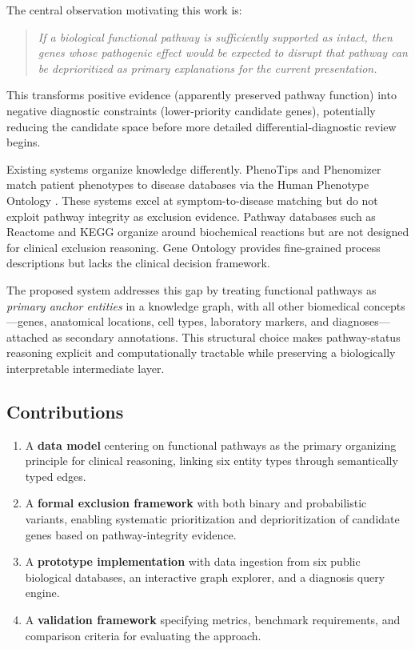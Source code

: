 \documentclass[12pt,a4paper]{article}
\begin{document}
The central observation motivating this work is:

\begin{quote}
\emph{If a biological functional pathway is sufficiently supported as intact, then genes whose pathogenic effect would be expected to disrupt that pathway can be deprioritized as primary explanations for the current presentation.}
\end{quote}

This transforms positive evidence (apparently preserved pathway function) into negative diagnostic constraints (lower-priority candidate genes), potentially reducing the candidate space before more detailed differential-diagnostic review begins.

Existing systems organize knowledge differently. PhenoTips \citep{Girdea2013} and Phenomizer \citep{Kohler2009} match patient phenotypes to disease databases via the Human Phenotype Ontology \citep{Robinson2008}. These systems excel at symptom-to-disease matching but do not exploit pathway integrity as exclusion evidence. Pathway databases such as Reactome \citep{Fabregat2018} and KEGG \citep{Kanehisa2023} organize around biochemical reactions but are not designed for clinical exclusion reasoning. Gene Ontology \citep{Ashburner2000} provides fine-grained process descriptions but lacks the clinical decision framework.

The proposed system addresses this gap by treating functional pathways as \emph{primary anchor entities} in a knowledge graph, with all other biomedical concepts---genes, anatomical locations, cell types, laboratory markers, and diagnoses---attached as secondary annotations. This structural choice makes pathway-status reasoning explicit and computationally tractable while preserving a biologically interpretable intermediate layer.

\subsection{Contributions}

\begin{enumerate}
    \item A \textbf{data model} centering on functional pathways as the primary organizing principle for clinical reasoning, linking six entity types through semantically typed edges.
    \item A \textbf{formal exclusion framework} with both binary and probabilistic variants, enabling systematic prioritization and deprioritization of candidate genes based on pathway-integrity evidence.
    \item A \textbf{prototype implementation} with data ingestion from six public biological databases, an interactive graph explorer, and a diagnosis query engine.
    \item A \textbf{validation framework} specifying metrics, benchmark requirements, and comparison criteria for evaluating the approach.
\end{enumerate}
\end{document}
